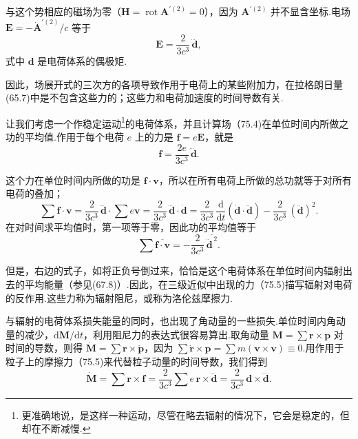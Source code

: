 与这个势相应的磁场为零（$\boldsymbol{H}=\operatorname{rot}\boldsymbol{A}^{\prime(2)}=0$），因为 $\boldsymbol{A}^{\prime(2)}$ 并不显含坐标.电场 $\boldsymbol{E}=-\dot{\boldsymbol{A}}^{\prime(2)}/c$ 等于
\begin{equation}
  \boldsymbol{E}=\frac{2}{3c^3}\,\dddot{\boldsymbol{d}},
\end{equation}
式中 $\boldsymbol{d}$ 是电荷体系的偶极矩.

因此，场展开式的三次方的各项导致作用于电荷上的某些附加力，在拉格朗日量(65.7)中是不包含这些力的；这些力和电荷加速度的时间导数有关.

让我们考虑一个作稳定运动\footnote{更准确地说，是这样一种运动，尽管在略去辐射的情况下，它会是稳定的，但却在不断减慢.}的电荷体系，并且计算场（75.4)在单位时间内所做之功的平均值.作用于每个电荷 $e$ 上的力是 $\boldsymbol{f}=e\boldsymbol{E}$，就是
\begin{equation}
  \boldsymbol{f}=\frac{2e}{3c^3}\,\dddot{\boldsymbol{d}}.
\end{equation}

这个力在单位时间内所做的功是 $\boldsymbol{f}\cdot\boldsymbol{v}$，所以在所有电荷上所做的总功就等于对所有电荷的叠加；
\begin{equation*}
  \sum\boldsymbol{f}\cdot\boldsymbol{v}
  =\frac{2}{3c^3}\,\dddot{\boldsymbol{d}}\cdot\sum e\boldsymbol{v}
  =\frac{2}{3c^3}\,\dddot{\boldsymbol{d}}\cdot\dot{\boldsymbol{d}}
  =\frac{2}{3c^3}\,\frac{\mathrm{d}}{\mathrm{d}t}(\dot{\boldsymbol{d}}\cdot\ddot{\boldsymbol{d}})
  -\frac{2}{3c^3}\,(\ddot{\boldsymbol{d}})^2.
\end{equation*}
在对时间求平均值时，第一项等于零，因此功的平均值等于
\begin{equation}
  \sum\overline{\boldsymbol{f}\cdot\boldsymbol{v}}
  =-\frac{2}{3c^3}\,\overline{\ddot{\boldsymbol{d}}^{\,2}}.
\end{equation}

但是，右边的式子，如将正负号倒过来，恰恰是这个电荷体系在单位时间内辐射出去的平均能量（参见(67.8)）.因此，在三级近似中出现的力（75.5)描写辐射对电荷的反作用.这些力称为辐射阻尼，或称为洛伦兹摩擦力.

与辐射的电荷体系损失能量的同时，也出现了角动量的一些损失.单位时间内角动量的减少，$\mathrm{d}\boldsymbol{M}/\mathrm{d}t$，利用阻尼力的表达式很容易算出.取角动量 $\boldsymbol{M}=\sum\boldsymbol{r}\times\boldsymbol{p}$ 对时间的导数，则得 $\dot{\boldsymbol{M}}=\sum\boldsymbol{r}\times\dot{\boldsymbol{p}}$，因为 $\sum\dot{\boldsymbol{r}}\times\boldsymbol{p}=\sum m(\boldsymbol{v}\times\boldsymbol{v})\equiv 0$.用作用于粒子上的摩擦力（75.5)来代替粒子动量的时间导数，我们得到
\begin{equation*}
  \dot{\boldsymbol{M}}=\sum\boldsymbol{r}\times\boldsymbol{f}
  =\frac{2}{3c^3}\sum e\,\boldsymbol{r}\times\dddot{\boldsymbol{d}}
  =\frac{2}{3c^3}\,\boldsymbol{d}\times\dddot{\boldsymbol{d}}.
\end{equation*}

